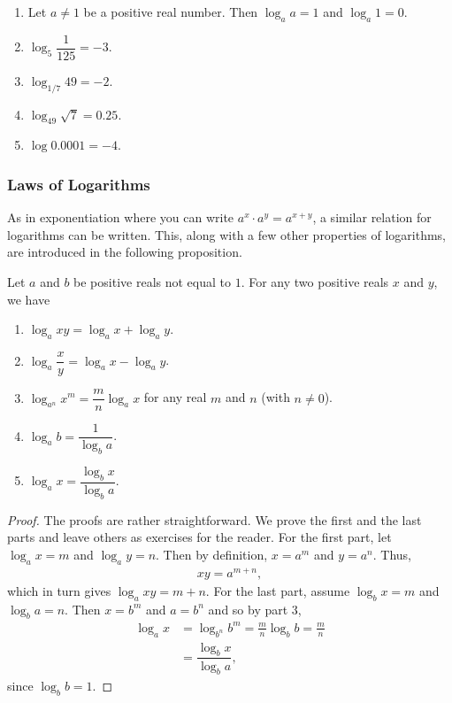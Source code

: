 \documentclass{subfile}
\begin{document}
	\begin{example}
		$ $
		\begin{enumerate}
			\item Let $a \neq 1$ be a positive real number. Then $\log_a a=1$ and $\log_a 1 = 0$.
			\item $\log_5 \dfrac{1}{125}=-3$.
			\item $\log_{1/7} 49 = -2$.
			\item $\log_{49} \sqrt 7 = 0.25$.
			\item $\log 0.0001 = -4$.
		\end{enumerate}
	\end{example}
\subsubsection{Laws of Logarithms}


	As in exponentiation where you can write $a^x \cdot a^y = a^{x+y}$, a similar relation for logarithms can be written. This, along with a few other properties of logarithms, are introduced in the following proposition.

	\begin{proposition}\label{prop:log_laws}
		Let $a$ and $b$ be positive reals not equal to $1$. For any two positive reals $x$ and $y$, we have
		\begin{enumerate}
			\item $\log_a xy = \log_a x + \log_a y$.
			\item $\log_a \dfrac{x}{y} = \log_a x - \log_a y$.
			\item $\log_{a^n} x^m = \dfrac{m}{n}\log_a x$ for any real $m$ and $n$ (with $n \neq 0$).
			\item $\log_a b = \dfrac{1}{\log_b a}$.
			\item $\log_a x = \dfrac{\log_b x}{\log_b a}$.
		\end{enumerate}
	\end{proposition}

	\begin{proof}
		The proofs are rather straightforward. We prove the first and the last parts and leave others as exercises for the reader. For the first part, let $\log_a x= m$ and $\log_a y =n$. Then by definition, $x=a^m$ and $y=a^n$. Thus,
			\begin{align*}
				xy=a^{m+n},
			\end{align*}
			which in turn gives $\log_a xy = m+n$. For the last part, assume $\log_b x = m$ and $\log_b a=n$. Then $x=b^m$ and $a=b^n$ and so by part $3$,
			\begin{align*}
				\log_a x &= \log_{b^n} b^m = \frac{m}{n} \log_b b =\frac{m}{n} \\
				&=\dfrac{\log_b x}{\log_b a},
			\end{align*}
			since $\log_b b =1$.
	\end{proof}
\end{document}
